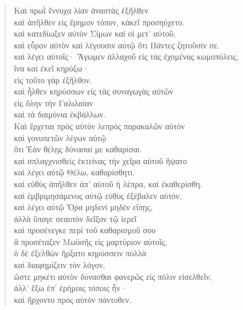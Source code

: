 \begin{verse}
	\large
	Καὶ πρωῒ ἔννυχα λίαν ἀναστὰς ἐξῆλθεν\\
	καὶ ἀπῆλθεν εἰς ἔρημον τόπον, κἀκεῖ προσηύχετο.\\
	καὶ κατεδίωξεν αὐτὸν Σίμων καὶ οἱ μετ’ αὐτοῦ,\\
	καὶ εὗρον αὐτὸν καὶ λέγουσιν αὐτῷ ὅτι Πάντες ζητοῦσίν σε.\\
	καὶ λέγει αὐτοῖς· Ἄγωμεν ἀλλαχοῦ εἰς τὰς ἐχομένας κωμοπόλεις,\\
	ἵνα καὶ ἐκεῖ κηρύξω·\\
	εἰς τοῦτο γὰρ ἐξῆλθον.\\
	καὶ ἦλθεν κηρύσσων εἰς τὰς συναγωγὰς αὐτῶν\\
	εἰς ὅλην τὴν Γαλιλαίαν\\
	καὶ τὰ δαιμόνια ἐκβάλλων.\\
	Καὶ ἔρχεται πρὸς αὐτὸν λεπρὸς παρακαλῶν αὐτὸν\\
	καὶ γονυπετῶν λέγων αὐτῷ\\
	ὅτι Ἐὰν θέλῃς δύνασαί με καθαρίσαι.\\
	καὶ σπλαγχνισθεὶς ἐκτείνας τὴν χεῖρα αὐτοῦ ἥψατο\\
	καὶ λέγει αὐτῷ Θέλω, καθαρίσθητι.\\
	καὶ εὐθὺς ἀπῆλθεν ἀπ’ αὐτοῦ ἡ λέπρα, καὶ ἐκαθερίσθη.\\
	καὶ ἐμβριμησάμενος αὐτῷ εὐθὺς ἐξέβαλεν αὐτόν,\\
	καὶ λέγει αὐτῷ Ὅρα μηδενὶ μηδὲν εἴπῃς,\\
	ἀλλὰ ὕπαγε σεαυτὸν δεῖξον τῷ ἱερεῖ\\
	καὶ προσένεγκε περὶ τοῦ καθαρισμοῦ σου\\
	ἃ προσέταξεν Μωϋσῆς εἰς μαρτύριον αὐτοῖς.\\
	ὁ δὲ ἐξελθὼν ἤρξατο κηρύσσειν πολλὰ\\
	καὶ διαφημίζειν τὸν λόγον,\\
	ὥστε μηκέτι αὐτὸν δύνασθαι φανερῶς εἰς πόλιν εἰσελθεῖν,\\
	ἀλλ’ ἔξω ἐπ’ ἐρήμοις τόποις ἦν·\\
	καὶ ἤρχοντο πρὸς αὐτὸν πάντοθεν.
\end{verse}
